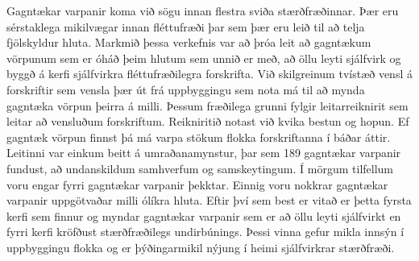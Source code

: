 Gagntækar varpanir koma við sögu innan flestra sviða stærðfræðinnar. Þær eru sérstaklega mikilvægar innan fléttufræði þar sem þær eru leið til að telja fjölskyldur hluta. Markmið þessa verkefnis var að þróa leit að gagntækum vörpunum sem er óháð þeim hlutum sem unnið er með, að öllu leyti sjálfvirk og byggð á kerfi sjálfvirkra fléttufræðilegra forskrifta. Við skilgreinum tvístæð vensl á forskriftir sem vensla þær út frá uppbyggingu sem nota má til að mynda gagntæka vörpun þeirra á milli. Þessum fræðilega grunni fylgir leitarreiknirit sem leitar að vensluðum forskriftum. Reikniritið notast við kvika bestun og hopun. Ef gagntæk vörpun finnst þá má varpa stökum flokka forskriftanna í báðar áttir. Leitinni var einkum beitt á umraðanamynstur, þar sem 189 gagntækar varpanir fundust, að undanskildum samhverfum og samskeytingum. Í mörgum tilfellum voru engar fyrri gagntækar varpanir þekktar. Einnig voru nokkrar gagntækar varpanir uppgötvaðar milli ólíkra hluta. Eftir því sem best er vitað er þetta fyrsta kerfi sem finnur og myndar gagntækar varpanir sem er að öllu leyti sjálfvirkt en fyrri kerfi kröfðust stærðfræðilegs undirbúnings. Þessi vinna gefur mikla innsýn í uppbyggingu flokka og er þýðingarmikil nýjung í heimi sjálfvirkrar stærðfræði.
